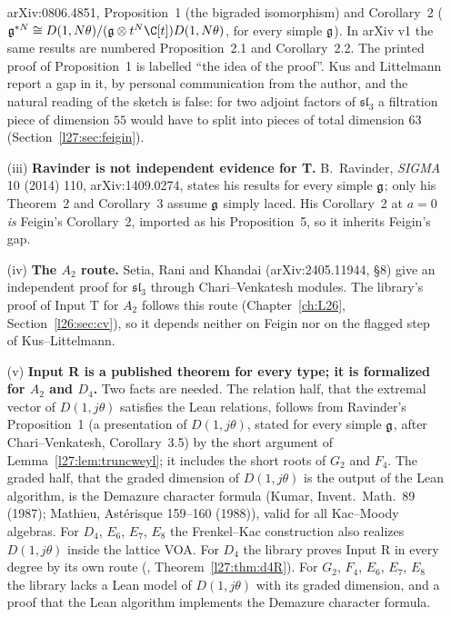 \begin{enumerate}
  arXiv:0806.4851, Proposition~1 (the bigraded isomorphism) and Corollary~2 ($\ltwentyseveng^{*N}\cong
  D(1,N\theta)/(\ltwentyseveng\otimes t^N\C[t])D(1,N\theta)$, for every simple $\ltwentyseveng$). In arXiv v1 the same results are
  numbered Proposition~2.1 and Corollary~2.2. The printed proof of Proposition~1 is labelled ``the idea of the proof''.
  Kus and Littelmann report a gap in it, by personal communication from the author, and the natural reading of the sketch is
  false: for two adjoint factors of $\mathfrak{sl}_3$ a filtration piece of dimension $55$ would have to split into pieces of
  total dimension $63$ (Section~\ref{l27:sec:feigin}).
\item[(iii)] \textbf{Ravinder is not independent evidence for T.} B.~Ravinder, \emph{SIGMA} 10 (2014) 110,
  arXiv:1409.0274, states his results for every simple $\ltwentyseveng$; only his Theorem~2 and Corollary~3 assume
  $\ltwentyseveng$ simply laced. His Corollary~2 at $a=0$ \emph{is} Feigin's Corollary~2, imported as his Proposition~5, so it
  inherits Feigin's gap.
\item[(iv)] \textbf{The $A_2$ route.} Setia, Rani and Khandai (arXiv:2405.11944, \S8) give an independent proof for
  $\mathfrak{sl}_3$ through Chari--Venkatesh modules. The library's proof of Input T for $A_2$ follows this route
  (Chapter~\ref{ch:L26}, Section~\ref{l26:sec:cv}), so it depends neither on Feigin nor on the flagged step of
  Kus--Littelmann.
\item[(v)] \textbf{Input R is a published theorem for every type; it is formalized for $A_2$ and $D_4$.} Two facts are needed.
  The relation half, that the extremal vector of $D(1,j\theta)$ satisfies the Lean relations, follows from Ravinder's
  Proposition~1 (a presentation of $D(1,j\theta)$, stated for every simple $\ltwentyseveng$, after Chari--Venkatesh,
  Corollary~3.5) by the short argument of Lemma~\ref{l27:lem:truncweyl}; it includes the short roots of $G_2$ and $F_4$. The
  graded half, that the graded dimension of $D(1,j\theta)$ is the output of the Lean algorithm, is the Demazure character
  formula (Kumar, Invent.\ Math.\ 89 (1987); Mathieu, Ast\'erisque 159--160 (1988)), valid for all Kac--Moody algebras. For
  $D_4$, $E_6$, $E_7$, $E_8$ the Frenkel--Kac construction also realizes $D(1,j\theta)$ inside the lattice VOA. For $D_4$
  the library proves Input R in every degree by its own route (,
  Theorem~\ref{l27:thm:d4R}). For $G_2$, $F_4$, $E_6$, $E_7$, $E_8$ the library lacks a Lean model of $D(1,j\theta)$ with
  its graded dimension, and a proof that the Lean algorithm implements the Demazure character formula.

\end{enumerate}
